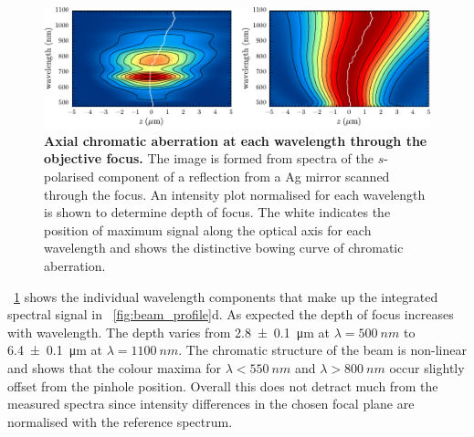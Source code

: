 \documentclass{article}
\begin{document}
\begin{figure}[bt]
\centering
\includegraphics{figures/axial_chromatic_aberration} %
\caption[Axial chromatic aberration at each wavelength through the objective focus]{\textbf{Axial chromatic aberration at each wavelength through the objective focus.} The image is formed from spectra of the $s$-polarised component of a reflection from a Ag mirror scanned through the focus. An intensity plot normalised for each wavelength is shown to determine depth of focus. The white indicates the position of maximum signal along the optical axis for each wavelength and shows the distinctive bowing curve of chromatic aberration.
}
\label{fig:axial_chromatic_aberration}
\vspace{-5pt}
\end{figure}

\figurename~\ref{fig:axial_chromatic_aberration} shows the individual wavelength components that make up the integrated spectral signal in \figurename~\ref{fig:beam_profile}d. As expected the depth of focus increases with wavelength. The depth varies from \SI{2.8\pm0.1}{\micro\metre} at $\lambda=\SI{500}{nm}$ to \SI{6.4\pm0.1}{\micro\metre} at $\lambda=\SI{1100}{nm}$. The chromatic structure of the beam is non-linear and shows that the colour maxima for $\lambda<\SI{550}{nm}$ and $\lambda>\SI{800}{nm}$ occur slightly offset from the pinhole position. Overall this does not detract much from the measured spectra since intensity differences in the chosen focal plane are normalised with the reference spectrum.
\end{document}
